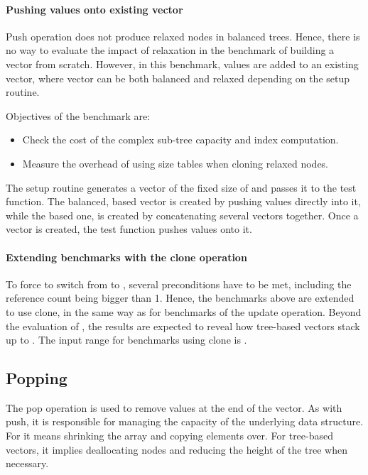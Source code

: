 \paragraph*{Pushing values onto existing vector}
Push operation does not produce relaxed nodes in balanced trees. Hence, there is no way to evaluate the impact of relaxation in the benchmark of building a vector from scratch. However, in this benchmark, values are added to an existing vector, where vector can be both balanced and relaxed depending on the setup routine.

Objectives of the benchmark are:
\begin{itemize}
    \item Check the cost of the complex sub-tree capacity and index computation.
    \item Measure the overhead of using size tables when cloning relaxed nodes.
\end{itemize}

The setup routine generates a vector of the fixed size of \n{} and passes it to the test function. The balanced, \rbtree{} based vector is created by pushing values directly into it, while the \rrbtree{} based one, is created by concatenating several vectors together. Once a vector is created, the test function pushes \n{} values onto it.

\paragraph*{Extending benchmarks with the clone operation}
To force \pvec{} to switch from \stdvec{} to \rrbvec{}, several preconditions have to be met, including the reference count being bigger than 1. Hence, the benchmarks above are extended to use clone, in the same way as for benchmarks of the update operation. Beyond the evaluation of \pvec{}, the results are expected to reveal how tree-based vectors stack up to \stdvec{}. The input range for benchmarks using clone is \range{[10, 20k]}.

\subsection{Popping}
The pop operation is used to remove values at the end of the vector. As with push, it is responsible for managing the capacity of the underlying data structure. For \stdvec{} it means shrinking the array and copying elements over. For tree-based vectors, it implies deallocating nodes and reducing the height of the tree when necessary.

